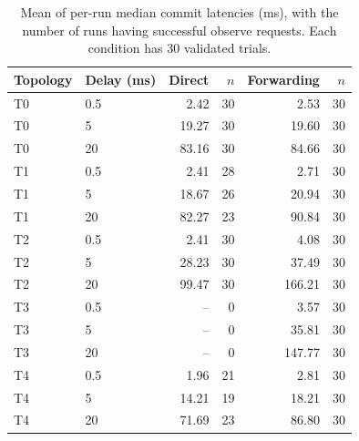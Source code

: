 \begin{table}[H]
  \centering
  \caption{Mean of per-run median commit latencies (ms), with the number of runs having successful observe requests. Each condition has 30 validated trials.}
  \label{tab:latency}
  \begin{tabular}{llrrrr}
    \toprule
    Topology & Delay (ms) & Direct & $n$ & Forwarding & $n$ \\
    \midrule
    T0 & 0.5 & 2.42 & 30 & 2.53 & 30 \\
    T0 & 5 & 19.27 & 30 & 19.60 & 30 \\
    T0 & 20 & 83.16 & 30 & 84.66 & 30 \\
    T1 & 0.5 & 2.41 & 28 & 2.71 & 30 \\
    T1 & 5 & 18.67 & 26 & 20.94 & 30 \\
    T1 & 20 & 82.27 & 23 & 90.84 & 30 \\
    T2 & 0.5 & 2.41 & 30 & 4.08 & 30 \\
    T2 & 5 & 28.23 & 30 & 37.49 & 30 \\
    T2 & 20 & 99.47 & 30 & 166.21 & 30 \\
    T3 & 0.5 & -- & 0 & 3.57 & 30 \\
    T3 & 5 & -- & 0 & 35.81 & 30 \\
    T3 & 20 & -- & 0 & 147.77 & 30 \\
    T4 & 0.5 & 1.96 & 21 & 2.81 & 30 \\
    T4 & 5 & 14.21 & 19 & 18.21 & 30 \\
    T4 & 20 & 71.69 & 23 & 86.80 & 30 \\
    \bottomrule
  \end{tabular}
\end{table}
